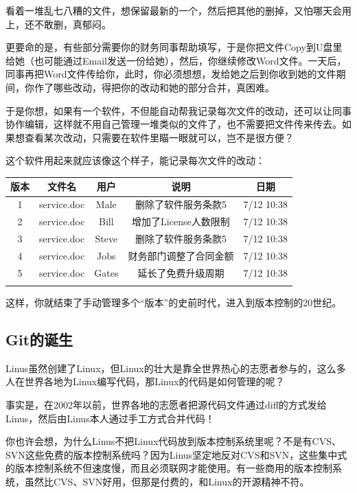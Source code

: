 \documentclass[•]{article}
\begin{document}
\begin{CJK}{UTF8}{gbsn}
\qquad 看着一堆乱七八糟的文件，想保留最新的一个，然后把其他的删掉，又怕哪天会用上，还不敢删，真郁闷。

\qquad 更要命的是，有些部分需要你的财务同事帮助填写，于是你把文件Copy到U盘里给她（也可能通过Email发送一份给她），然后，你继续修改Word文件。一天后，同事再把Word文件传给你，此时，你必须想想，发给她之后到你收到她的文件期间，你作了哪些改动，得把你的改动和她的部分合并，真困难。

\qquad 于是你想，如果有一个软件，不但能自动帮我记录每次文件的改动，还可以让同事协作编辑，这样就不用自己管理一堆类似的文件了，也不需要把文件传来传去。如果想查看某次改动，只需要在软件里瞄一眼就可以，岂不是很方便？

\qquad 这个软件用起来就应该像这个样子，能记录每次文件的改动：\\
\begin{center}
\begin{tabular}{ccccc}
\hline
版本& 文件名& 用户& 说明& 日期\\
\hline
1& service.doc& Male& 删除了软件服务条款5& 7/12 10:38\\
2& service.doc& Bill&  	增加了License人数限制& 7/12 10:38\\
3& service.doc& Steve& 删除了软件服务条款5& 7/12 10:38\\
4& service.doc& Jobs& 财务部门调整了合同金额& 7/12 10:38\\
5& service.doc& Gates& 延长了免费升级周期& 7/12 10:38\\
\hline\\
\end{tabular}
\end{center}

\qquad 这样，你就结束了手动管理多个“版本”的史前时代，进入到版本控制的20世纪。

\subsection{Git的诞生}


\qquad Linus虽然创建了Linux，但Linux的壮大是靠全世界热心的志愿者参与的，这么多人在世界各地为Linux编写代码，那Linux的代码是如何管理的呢？

\qquad 事实是，在2002年以前，世界各地的志愿者把源代码文件通过diff的方式发给Linus，然后由Linus本人通过手工方式合并代码！

\qquad 你也许会想，为什么Linus不把Linux代码放到版本控制系统里呢？不是有CVS、SVN这些免费的版本控制系统吗？因为Linus坚定地反对CVS和SVN，这些集中式的版本控制系统不但速度慢，而且必须联网才能使用。有一些商用的版本控制系统，虽然比CVS、SVN好用，但那是付费的，和Linux的开源精神不符。


\end{CJK}
\end{document}
